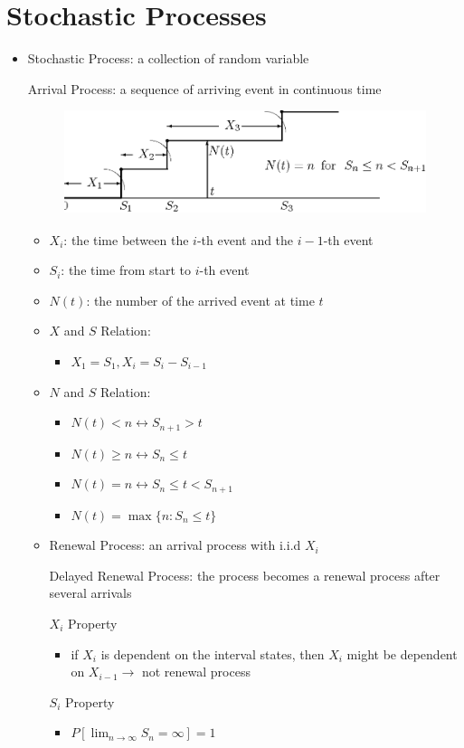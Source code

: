 \documentclass[a4paper]{article}
\begin{document}
\section{Stochastic Processes}
\begin{itemize}
    \item Stochastic Process: a collection of random variable

        Arrival Process: a sequence of arriving event in continuous time
\begin{figure} [H]
    \includegraphics[width=0.5\linewidth, center]{image/arrival_process.png}
\end{figure}
        \begin{itemize}
            \item $X_i$: the time between the $i$-th event and the $i-1$-th event
            \item $S_i$: the time from start to $i$-th event
            \item $N(t)$: the number of the arrived event at time $t$
            \item $X$ and $S$ Relation:
                \begin{itemize}
                    \item $X_1 = S_1, X_i = S_i - S_{i-1}$
                \end{itemize}
            \item $N$ and $S$ Relation:
                \begin{itemize}
                    \item $N(t) < n \leftrightarrow S_{n+1} > t$
                    \item $N(t) \geq n \leftrightarrow S_n \leq t$
                    \item $N(t) = n \leftrightarrow S_n \leq t < S_{n+1}$
                    \item $N(t) = \max \{n: S_n \leq t\}$
                \end{itemize}
            \item Renewal Process: an arrival process with i.i.d $X_i$

                Delayed Renewal Process: the process becomes a renewal process after several arrivals

                $X_i$ Property
                \begin{itemize}
                    \item if $X_i$ is dependent on the interval states, then $X_i$ might be dependent on $X_{i-1} \rightarrow$ not renewal process
                \end{itemize}
                $S_i$ Property
                \begin{itemize}
                    \item $P[\lim_{n \rightarrow \infty} S_n = \infty] = 1$


\end{itemize}
\end{itemize}
\end{itemize}
\end{document}
